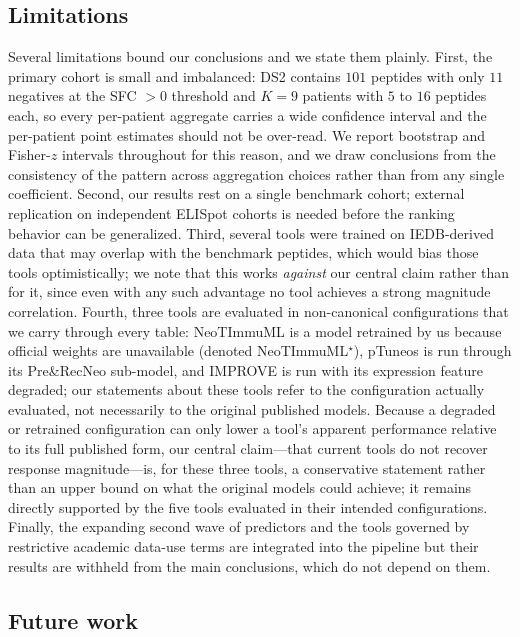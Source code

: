 \subsection{Limitations}
\label{sec:disc-limits}

Several limitations bound our conclusions and we state them plainly. First, the
primary cohort is small and imbalanced: DS2 contains $101$ peptides with only
$11$ negatives at the SFC $>0$ threshold and $K=9$ patients with $5$ to $16$
peptides each, so every per-patient aggregate carries a wide confidence interval
and the per-patient point estimates should not be over-read. We report bootstrap
and Fisher-$z$ intervals throughout for this reason, and we draw conclusions from
the consistency of the pattern across aggregation choices rather than from any
single coefficient. Second, our results rest on a single benchmark cohort;
external replication on independent ELISpot cohorts is needed before the ranking
behavior can be generalized. Third, several tools were trained on IEDB-derived
data that may overlap with the benchmark peptides, which would bias those tools
optimistically; we note that this works \emph{against} our central claim rather
than for it, since even with any such advantage no tool achieves a strong
magnitude correlation. Fourth, three tools are evaluated in non-canonical
configurations that we carry through every table: NeoTImmuML is a model retrained
by us because official weights are unavailable (denoted NeoTImmuML$^\star$),
pTuneos is run through its Pre\&RecNeo sub-model, and IMPROVE is run with its
expression feature degraded; our statements about these tools refer to the
configuration actually evaluated, not necessarily to the original published
models. Because a degraded or retrained configuration can only lower a tool's
apparent performance relative to its full published form, our central claim---that
current tools do not recover response magnitude---is, for these three tools, a
conservative statement rather than an upper bound on what the original models could
achieve; it remains directly supported by the five tools evaluated in their
intended configurations. Finally, the expanding second wave of predictors and the tools governed by
restrictive academic data-use terms are integrated into the pipeline but their
results are withheld from the main conclusions, which do not depend on them.

\subsection{Future work}
\label{sec:disc-future}

